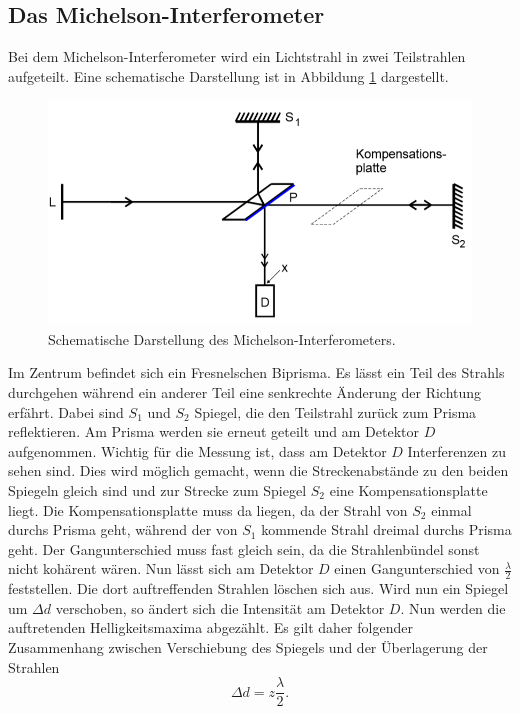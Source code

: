 \subsection{Das Michelson-Interferometer}
Bei dem Michelson-Interferometer wird ein Lichtstrahl in zwei Teilstrahlen aufgeteilt. Eine schematische Darstellung
ist in Abbildung \ref{abb:1} dargestellt.
\begin{figure}[H]
  \centering
  \includegraphics[width=\textwidth]{content/Aufbau.png}
  \caption{Schematische Darstellung des Michelson-Interferometers.\cite{1}}
  \label{abb:1}
\end{figure}
Im Zentrum befindet sich ein Fresnelschen Biprisma. Es lässt ein Teil des Strahls
durchgehen während ein anderer Teil eine senkrechte Änderung der Richtung erfährt. Dabei sind
$S_1$ und $S_2$ Spiegel, die den Teilstrahl zurück zum Prisma reflektieren.
Am Prisma werden sie erneut geteilt und am Detektor $D$ aufgenommen.
Wichtig für die Messung ist, dass am Detektor $D$ Interferenzen zu sehen sind.
Dies wird möglich gemacht,
wenn die Streckenabstände zu den beiden Spiegeln gleich sind und zur Strecke zum Spiegel $S_2$ eine
Kompensationsplatte liegt. Die Kompensationsplatte muss da liegen, da der Strahl von $S_2$ einmal durchs
Prisma geht, während der von $S_1$ kommende Strahl dreimal durchs Prisma geht. Der Gangunterschied
muss fast gleich sein, da die Strahlenbündel sonst nicht kohärent wären.
Nun lässt sich am Detektor $D$ einen Gangunterschied von $\frac{\lambda}{2}$ feststellen.
Die dort auftreffenden Strahlen löschen sich aus. Wird nun ein Spiegel um $\Delta d$ verschoben,
so ändert sich die Intensität am Detektor $D$. Nun werden die auftretenden Helligkeitsmaxima abgezählt.
Es gilt daher folgender Zusammenhang zwischen Verschiebung des Spiegels und der Überlagerung der Strahlen
\begin{equation}
  \Delta d = z \frac{\lambda}{2}.
  \label{eq:1}
\end{equation}
